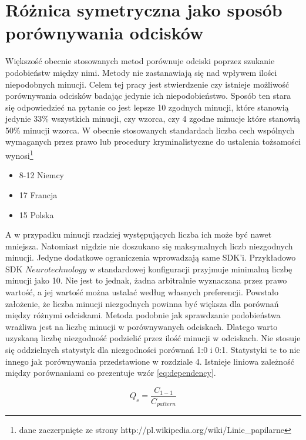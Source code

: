 \chapter {Różnica symetryczna jako sposób porównywania odcisków}

Większość obecnie stosowanych metod porównuje odciski poprzez szukanie podobieństw między nimi. Metody nie zastanawiają się nad wpływem ilości niepodobnych minucji. Celem tej pracy jest stwierdzenie czy istnieje możliwość porównywania odcisków badając jedynie ich niepodobieństwo. Sposób ten stara się odpowiedzieć na pytanie co jest lepsze 10 zgodnych minucji, które stanowią jedynie 33\% wszystkich minucji, czy wzorca, czy 4 zgodne minucje które stanowią 50\% minucji wzorca. W obecnie stosowanych standardach liczba cech wspólnych wymaganych przez prawo lub procedury kryminalistyczne do ustalenia tożsamości wynosi\footnote{dane zaczerpnięte ze strony http://pl.wikipedia.org/wiki/Linie\_papilarne}
\renewcommand*{\labelitemi}{\bullet}
\begin{itemize}
	\item 8-12 Niemcy
	\item 17 Francja
	\item 15 Polska
\end{itemize}
\vspace{.5cm}\par
A w przypadku minucji rzadziej występujących liczba ich może być nawet mniejsza. Natomiast nigdzie nie doszukano się maksymalnych liczb niezgodnych minucji. Jedyne dodatkowe ograniczenia wprowadzają same SDK'i. Przykładowo SDK $Neurotechnology$ w standardowej konfiguracji przyjmuje minimalną liczbę minucji jako 10. Nie jest to jednak, żadna arbitralnie wyznaczana przez prawo wartość, a jej wartość można ustalać według własnych preferencji. Powstało założenie, że liczba minucji niezgodnych powinna być większa dla porównań między różnymi odciskami. Metoda podobnie jak sprawdzanie podobieństwa wrażliwa jest na liczbę minucji w porównywanych odciskach. Dlatego warto uzyskaną liczbę niezgodność podzielić przez ilość minucji w odciskach. Nie stosuje się oddzielnych statystyk dla niezgodności porównań 1:0 i 0:1. Statystyki te to nic innego jak porównywania przedstawione w rozdziale 4. Istnieje liniowa zależność między porównaniami co prezentuje wzór \ref{eq:dependency}.

\begin{equation}
Q_s = \frac{C_{1-1}}{C_{pattern}}
\label{eq:Q_s}
\end{equation}

